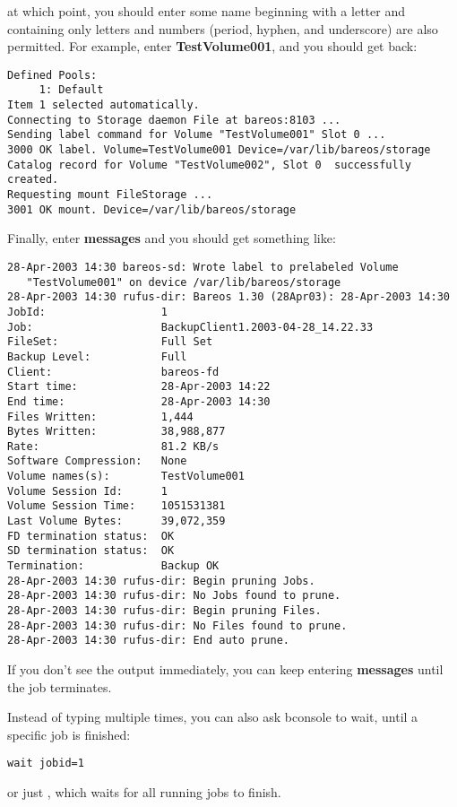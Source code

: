 at which point, you should enter some name beginning with a letter and
containing only letters and numbers (period, hyphen, and underscore) are also
permitted. For example, enter {\bf TestVolume001}, and you should get back:

\footnotesize
\begin{verbatim}
Defined Pools:
     1: Default
Item 1 selected automatically.
Connecting to Storage daemon File at bareos:8103 ...
Sending label command for Volume "TestVolume001" Slot 0 ...
3000 OK label. Volume=TestVolume001 Device=/var/lib/bareos/storage
Catalog record for Volume "TestVolume002", Slot 0  successfully created.
Requesting mount FileStorage ...
3001 OK mount. Device=/var/lib/bareos/storage
\end{verbatim}
\normalsize

Finally, enter {\bf messages} and you should get something like:

\footnotesize
\begin{verbatim}
28-Apr-2003 14:30 bareos-sd: Wrote label to prelabeled Volume
   "TestVolume001" on device /var/lib/bareos/storage
28-Apr-2003 14:30 rufus-dir: Bareos 1.30 (28Apr03): 28-Apr-2003 14:30
JobId:                  1
Job:                    BackupClient1.2003-04-28_14.22.33
FileSet:                Full Set
Backup Level:           Full
Client:                 bareos-fd
Start time:             28-Apr-2003 14:22
End time:               28-Apr-2003 14:30
Files Written:          1,444
Bytes Written:          38,988,877
Rate:                   81.2 KB/s
Software Compression:   None
Volume names(s):        TestVolume001
Volume Session Id:      1
Volume Session Time:    1051531381
Last Volume Bytes:      39,072,359
FD termination status:  OK
SD termination status:  OK
Termination:            Backup OK
28-Apr-2003 14:30 rufus-dir: Begin pruning Jobs.
28-Apr-2003 14:30 rufus-dir: No Jobs found to prune.
28-Apr-2003 14:30 rufus-dir: Begin pruning Files.
28-Apr-2003 14:30 rufus-dir: No Files found to prune.
28-Apr-2003 14:30 rufus-dir: End auto prune.
\end{verbatim}
\normalsize

If you don't see the output immediately, you can keep entering {\bf messages}
until the job terminates.

Instead of typing  multiple times, 
you can also ask bconsole to wait, until a specific job is finished:
\footnotesize
\begin{verbatim}
wait jobid=1
\end{verbatim}
\normalsize
or just , which waits for all running jobs to finish.

